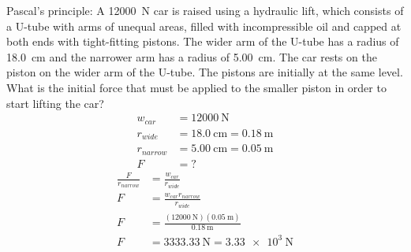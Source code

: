 \documentclass{article}
\begin{document}
Pascal's principle: A \SI{12000}{\newton} car is raised using a hydraulic lift, which consists of a U-tube with arms of unequal areas, filled with incompressible oil and capped at both ends with tight-fitting pistons. The wider arm of the U-tube has a radius of \SI{18.0}{\centi \meter} and the narrower arm has a radius of \SI{5.00}{\centi \meter}. The car rests on the piston on the wider arm of the U-tube. The pistons are initially at the same level. What is the initial force that must be applied to the smaller piston in order to start lifting the car?
\begin{align*}
	w_{car} & = \SI{12000}{\newton} \\
	r_{wide} & = \SI{18.0}{\centi \meter} = \SI{0.18}{\meter} \\
	r_{narrow} & = \SI{5.00}{\centi \meter} = \SI{0.05}{\meter} \\
	F & = ?
\end{align*}
\begin{align*}
	\frac{ F }{ r_{narrow} } & = \frac{ w_{car} }{ r_{wide} } \\
	F & = \frac{ w_{car}r_{narrow} }{ r_{wide} } \\
	F & = \frac{ (\SI{12000}{\newton})(\SI{0.05}{\meter}) }{ \SI{0.18}{\meter} } \\
	F & = \SI{3333.33}{\newton} = \SI{3.33e3}{\newton}
\end{align*}
\end{document}
